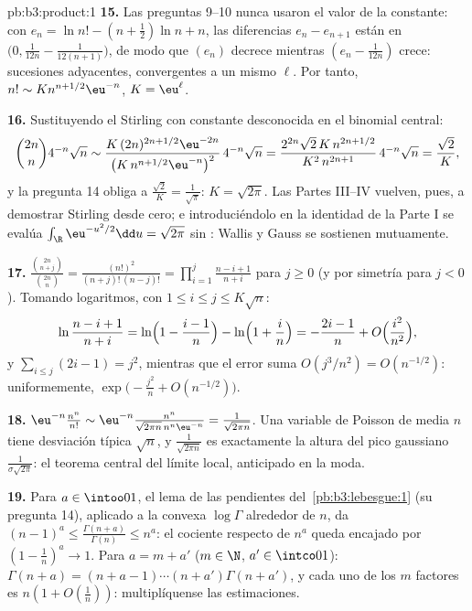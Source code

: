 \begin{solution}{pb:b3:product:1}
\textbf{15.} Las preguntas 9--10 nunca usaron el valor de la constante:
con $e_n = \ln n! - (n+\frac12)\ln n + n$, las diferencias
$e_n - e_{n+1}$ están en $\bigl(0, \frac1{12n} -
\frac1{12(n+1)}\bigr)$, de modo que $(e_n)$ decrece mientras $(e_n -
\frac1{12n})$ crece: sucesiones adyacentes, convergentes a un mismo
$\ell$. Por tanto, $n! \sim K n^{n+1/2}\eu^{-n}$, $K =
\eu^\ell$.

\textbf{16.} Sustituyendo el Stirling con constante desconocida en el
binomial central:
\[
\binom{2n}n4^{-n}\sqrt n \sim
\frac{K\,(2n)^{2n+1/2}\eu^{-2n}}{\bigl(K\,n^{n+1/2}
\eu^{-n}\bigr)^2}\,4^{-n}\sqrt n
= \frac{2^{2n}\sqrt{2}\,K\,n^{2n+1/2}}{K^2\,n^{2n+1}}
\,4^{-n}\sqrt n = \frac{\sqrt2}{K},
\]
y la pregunta 14 obliga a $\frac{\sqrt2}K = \frac1{\sqrt\pi}$:
$K = \sqrt{2\pi}$. Las Partes III--IV vuelven, pues, a demostrar
Stirling desde cero; e introduciéndolo en la identidad de la Parte I se
evalúa $\int_\R\eu^{-u^2/2}\dd u = \sqrt{2\pi}$ sin
: Wallis y Gauss se
sostienen mutuamente.

\textbf{17.} $\frac{\binom{2n}{n+j}}{\binom{2n}n} =
\frac{(n!)^2}{(n+j)!\,(n-j)!} =
\prod_{i=1}^{j}\frac{n-i+1}{n+i}$ para $j \geq 0$ (y por simetría para
$j < 0$). Tomando logaritmos, con $1 \leq i
\leq j \leq K\sqrt n$:
\[
\ln\frac{n-i+1}{n+i} = \ln\Bigl(1 - \frac{i-1}n\Bigr) -
\ln\Bigl(1 + \frac in\Bigr) = -\frac{2i-1}{n} +
O\Bigl(\frac{i^2}{n^2}\Bigr),
\]
y $\sum_{i\leq j}(2i - 1) = j^2$, mientras que el error suma
$O(j^3/n^2) = O(n^{-1/2})$: uniformemente,
$\exp\bigl(-\frac{j^2}n + O(n^{-1/2})\bigr)$.

\textbf{18.} $\eu^{-n}\frac{n^n}{n!} \sim \eu^{-n}
\frac{n^n}{\sqrt{2\pi n}\,n^n\eu^{-n}} =
\frac1{\sqrt{2\pi n}}$. Una variable de Poisson de media $n$ tiene
desviación típica $\sqrt n$, y $\frac1{\sqrt{2\pi n}}$ es exactamente la
altura del pico gaussiano $\frac1{\sigma\sqrt{2\pi}}$: el teorema
central del límite local, anticipado en la moda.

\textbf{19.} Para $a \in \intoo01$, el lema de las pendientes
del~\cref{pb:b3:lebesgue:1} (su pregunta 14), aplicado a la convexa
$\log\Gamma$ alrededor de $n$, da $(n-1)^a \leq
\frac{\Gamma(n+a)}{\Gamma(n)} \leq n^a$: el cociente respecto de $n^a$
queda encajado por $(1 - \frac1n)^a \to 1$. Para $a = m + a'$
($m \in \N$, $a' \in \intco01$): $\Gamma(n+a) = (n + a - 1)
\cdots(n + a')\Gamma(n + a')$, y cada uno de los $m$ factores es
$n(1 + O(\frac1n))$: multiplíquense las estimaciones.


\end{solution}
